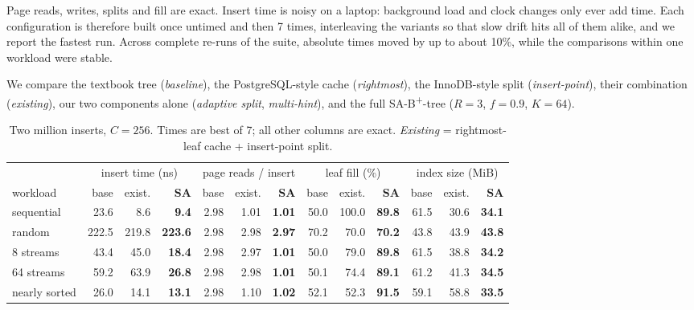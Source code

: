 \documentclass[conference]{IEEEtran}
\newcommand{\sab}{SA-B\textsuperscript{+}-tree}
\begin{document}
Page reads, writes, splits and fill are exact. Insert time is noisy on a
laptop: background load and clock changes only ever add time. Each
configuration is therefore built once untimed and then 7 times, interleaving
the variants so that slow drift hits all of them alike, and we report the
fastest run. Across complete re-runs of the suite, absolute times moved by
up to about 10\%, while the comparisons within one workload were stable.

We compare the textbook tree (\emph{baseline}), the PostgreSQL-style cache
(\emph{rightmost}), the InnoDB-style split (\emph{insert-point}), their
combination (\emph{existing}), our two components alone (\emph{adaptive split},
\emph{multi-hint}), and the full \sab{} ($R=3$, $f=0.9$, $K=64$).

\begin{table}[t]
\centering
\caption{Two million inserts, $C=256$. Times are best of 7; all other columns are exact.
\emph{Existing} = rightmost-leaf cache + insert-point split.}
\label{tab:main}
\small
\begin{tabular}{@{}l rrr rrr rrr rrr@{}}
\toprule
 & \multicolumn{3}{c}{insert time (ns)} & \multicolumn{3}{c}{page reads / insert}
 & \multicolumn{3}{c}{leaf fill (\%)} & \multicolumn{3}{c}{index size (MiB)} \\
\cmidrule(lr){2-4}\cmidrule(lr){5-7}\cmidrule(lr){8-10}\cmidrule(l){11-13}
workload & base & exist. & \textbf{SA} & base & exist. & \textbf{SA}
 & base & exist. & \textbf{SA} & base & exist. & \textbf{SA} \\
\midrule
sequential      & 23.6  & 8.6   & \textbf{9.4}   & 2.98 & 1.01 & \textbf{1.01} & 50.0 & 100.0 & \textbf{89.8} & 61.5 & 30.6 & \textbf{34.1} \\
random          & 222.5 & 219.8 & \textbf{223.6} & 2.98 & 2.98 & \textbf{2.97} & 70.2 & 70.0  & \textbf{70.2} & 43.8 & 43.9 & \textbf{43.8} \\
8 streams       & 43.4  & 45.0  & \textbf{18.4}  & 2.98 & 2.97 & \textbf{1.01} & 50.0 & 79.0  & \textbf{89.8} & 61.5 & 38.8 & \textbf{34.2} \\
64 streams      & 59.2  & 63.9  & \textbf{26.8}  & 2.98 & 2.98 & \textbf{1.01} & 50.1 & 74.4  & \textbf{89.1} & 61.2 & 41.3 & \textbf{34.5} \\
nearly sorted   & 26.0  & 14.1  & \textbf{13.1}  & 2.98 & 1.10 & \textbf{1.02} & 52.1 & 52.3  & \textbf{91.5} & 59.1 & 58.8 & \textbf{33.5} \\
\bottomrule
\end{tabular}
\end{table}
\end{document}
